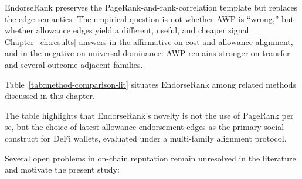 EndorseRank preserves the PageRank-and-rank-correlation template but replaces the edge semantics. The empirical question is not whether AWP is ``wrong,'' but whether allowance edges yield a different, useful, and cheaper signal. Chapter~\ref{ch:results} answers in the affirmative on cost and allowance alignment, and in the negative on universal dominance: AWP remains stronger on transfer and several outcome-adjacent families.


Table~\ref{tab:method-comparison-lit} situates EndorseRank among related methods discussed in this chapter.

\begin{table}[htbp]
\centering
\caption{Comparison of selected graph reputation methods (conceptual).}
\label{tab:method-comparison-lit}
\end{table}

The table highlights that EndorseRank's novelty is not the use of PageRank per se, but the choice of latest-allowance endorsement edges as the primary social construct for DeFi wallets, evaluated under a multi-family alignment protocol.


Several open problems in on-chain reputation remain unresolved in the literature and motivate the present study:

